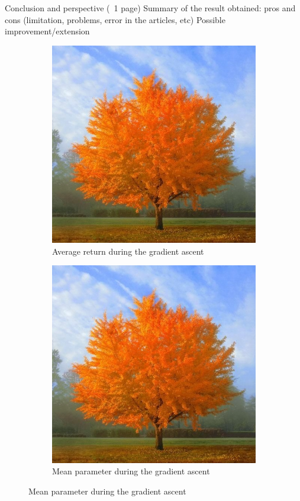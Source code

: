 \documentclass[a4paper, 11pt]{scrartcl}
\begin{document}
Conclusion and perspective (~1 page)
Summary of the result obtained: pros and cons (limitation, problems, error in the articles, etc)
Possible improvement/extension




 
\begin{figure}[h]
\centering
\begin{subfigure}{.5\textwidth}
  \centering
  \includegraphics[width=\linewidth]{tree.jpg}
  \caption{Average return during the gradient ascent}
  \label{fig:sub3}
\end{subfigure}%
\begin{subfigure}{.5\textwidth}
  \centering
  \includegraphics[width=\linewidth]{tree.jpg}
  \caption{Mean parameter during the gradient ascent}
  \label{fig:sub4}
\end{subfigure}%
\end{figure}
\end{document}

